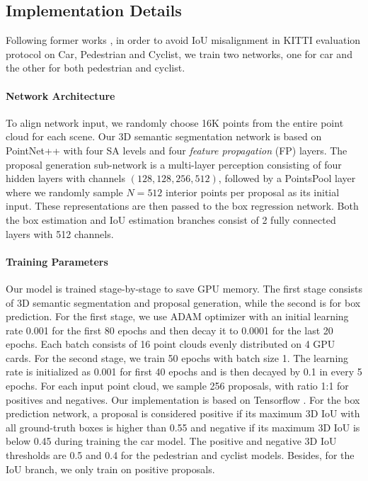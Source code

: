 \documentclass[10pt,twocolumn,letterpaper]{article}
\begin{document}
\subsection{Implementation Details}
Following former works \cite{VOXELNET,lang2018pointpillars,AVOD,yan2018second}, in order to avoid IoU misalignment in KITTI evaluation protocol on Car, Pedestrian and Cyclist, we train two networks, one for car and the other for both pedestrian and cyclist.

\vspace{-0.1in}
\paragraph{Network Architecture}
To align network input, we randomly choose 16K points from the entire point cloud for each scene.
Our 3D semantic segmentation network is based on PointNet++ with four SA levels and four {\it feature propagation} (FP) layers. 
The proposal generation sub-network is a multi-layer perception consisting of four hidden layers with channels $(128, 128, 256, 512)$, followed by a PointsPool layer where we randomly sample $N=512$ interior points per proposal as its initial input. These representations are then passed to the box regression network. Both the box estimation and IoU estimation branches consist of 2 fully connected layers with 512 channels. 

\vspace{-0.1in}
\paragraph{Training Parameters} 
Our model is trained stage-by-stage to save GPU memory. The first stage consists of 3D semantic segmentation and proposal generation, while the second is for box prediction. For the first stage, we use ADAM \cite{AdamOptimizer} optimizer with an initial learning rate 0.001 for the first 80 epochs and then decay it to 0.0001 for the last 20 epochs. Each batch consists of 16 point clouds evenly distributed on 4 GPU cards. 
For the second stage, we train 50 epochs with batch size 1. The learning rate is initialized as 0.001 for first 40 epochs and is then decayed by 0.1 in every 5 epochs.
For each input point cloud, we sample 256 proposals, with ratio 1:1 for positives and negatives.
Our implementation is based on Tensorflow \cite{Tensorflow}. For the box prediction network, a proposal is considered positive if its maximum 3D IoU with all ground-truth boxes is higher than 0.55 and negative if its maximum 3D IoU is below 0.45 during training the car model. The positive and negative 3D IoU thresholds are 0.5 and 0.4 for the pedestrian and cyclist models. 
Besides, for the IoU branch, we only train on positive proposals.
\end{document}
